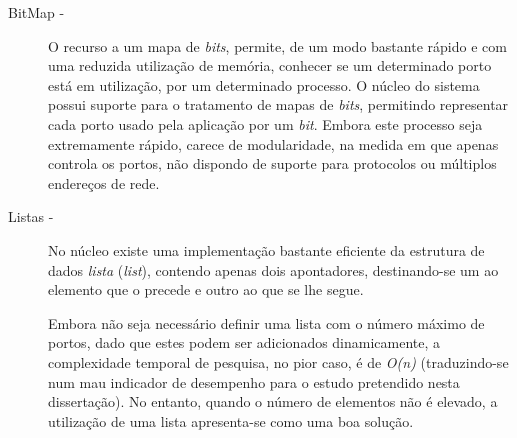 \begin{description}

\item[BitMap - ]

O recurso a um mapa de \textit{bits}, permite, de um modo bastante rápido e com uma reduzida utilização de memória, conhecer se um determinado porto está em utilização, por um determinado processo.
O núcleo do sistema possui suporte para o tratamento de mapas de \textit{bits}, permitindo representar cada porto usado pela aplicação por um \textit{bit}.
Embora este processo seja extremamente rápido, carece de modularidade, na medida em que apenas controla os portos, não dispondo de suporte para protocolos ou múltiplos endereços de rede.

 



\item[Listas - ]

No núcleo existe uma implementação bastante eficiente da estrutura de dados \emph{lista} (\emph{list}), contendo apenas dois apontadores, destinando-se um ao elemento que o precede e outro ao que se lhe segue.

Embora não seja necessário definir uma lista com o número máximo de portos, dado que estes podem ser adicionados dinamicamente, a complexidade temporal de pesquisa, no pior caso, é de \textit{O(n)} (traduzindo-se num mau indicador de desempenho para o estudo pretendido nesta dissertação).
No entanto, quando o número de elementos não é elevado, a utilização de uma lista apresenta-se como uma boa solução.



\end{description}
